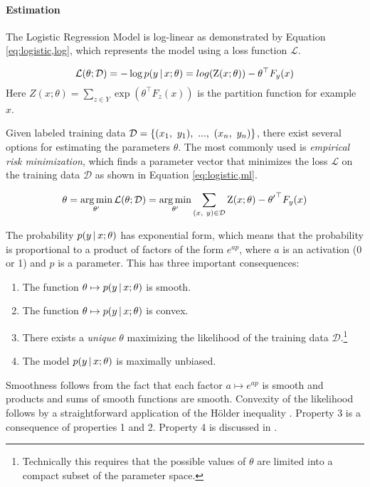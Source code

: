 \paragraph{Estimation}
The Logistic Regression Model is log-linear as demonstrated by
Equation \ref{eq:logistic,log}, which represents the model using a
loss function $\mathcal{L}$.

\begin{equation}
\mathcal{L}(\theta\mbox{$ ; \, $}\mathcal{D}) = -\log p(y\mbox{$ \, | \, $} x\mbox{$ ; \, $} \theta) = log(\mbox{${\rm Z}$}(x;\theta)) - \theta^\top F_y(x)\label{eq:logistic,log}
\end{equation}
Here $Z(x;\theta) = \sum_{z \in Y}\exp(\theta^\top F_{z}(x))$ is the partition function for example $x$.

Given labeled training data $\mbox{${\mathcal{D}}$} = \{(x_1,\ y_1),\ ...,\ (x_n,\
y_n)\}$, there exist several options for estimating the parameters
$\theta$. The most commonly used is {\it empirical risk minimization},
which finds a parameter vector that minimizes the loss $\mathcal{L}$ on the
training data $\mathcal{D}$ as shown in Equation \eqref{eq:logistic,ml}.

\begin{equation}
\theta = \operatorname*{arg\,min}_{\theta'} \mathcal{L}(\theta\mbox{$ ; \, $} \mathcal{D}) = \operatorname*{arg\,min}_{\theta'}\sum_{(x,\ y) \in \mathcal{D}} \mbox{${\rm Z}$}(x\mbox{$ ; \, $} \theta) - {\theta'}^\top F_y(x)\label{eq:logistic,ml}
\end{equation}

The probability $p(y\mbox{$ \, | \, $} x\mbox{$ ; \, $} \theta)$ has exponential form,
which means that the probability is proportional to a product of
factors of the form $e^{ap}$, where $a$ is an activation (0 or 1) and
$p$ is a parameter. This has three important consequences:

\begin{enumerate}
\item The function $\theta \mapsto p(y\mbox{$ \, | \, $} x\mbox{$ ; \, $} \theta)$ is smooth.
\item The function $\theta \mapsto p(y\mbox{$ \, | \, $} x\mbox{$ ; \, $} \theta)$ is convex.
\item There exists a {\it unique} $\theta$ maximizing the likelihood of the training data $\mathcal{D}$.\footnote{Technically this requires that the possible values of $\theta$ are limited into a compact subset of the parameter space.}
\item The model $p(y\mbox{$ \, | \, $} x\mbox{$ ; \, $} \theta)$ is maximally unbiased. 
\end{enumerate}

Smoothness follows from the fact that each factor $a \mapsto e^{ap}$
is smooth and products and sums of smooth functions are
smooth. Convexity of the likelihood follows by a straightforward application of the Hölder inequality \cite{}. Property 3 is a consequence of properties 1 and 2.
Property 4 is discussed in \cite{foo}.

